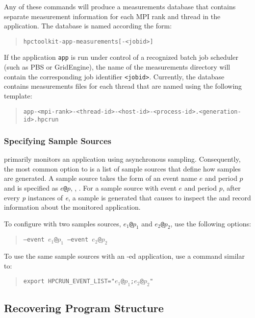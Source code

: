 \documentclass[11pt,letterpaper]{report}
\begin{document}
%
Any of these commands will produce a measurements database that contains separate measurement information for each MPI rank and thread in the application.
The database is named according the form:
\begin{quote}
  \verb|hpctoolkit-app-measurements[-<jobid>]|
\end{quote}
If the application \texttt{app} is run under control of a recognized batch job scheduler (such as PBS or GridEngine), the name of the measurements directory will contain the corresponding job identifier \texttt{<jobid>}.
Currently, the database contains measurements files for each thread that are named using the following template:
\begin{quote}
  \verb|app-<mpi-rank>-<thread-id>-<host-id>-<process-id>.<generation-id>.hpcrun|
\end{quote}

\subsubsection{Specifying Sample Sources}

\HPCToolkit{} primarily monitors an application using asynchronous sampling.
Consequently, the most common option to \hpcrun{} is a list of sample sources that define how samples are generated.
A sample source takes the form of an event name $e$ and period $p$ and is specified as \texttt{$e$@$p$}, \eg{}, .
For a sample source with event $e$ and period $p$, after every \emph{p} instances of \emph{e}, a sample is generated that causes \hpcrun{} to inspect the and record information about the monitored application.

To configure \hpcrun{} with two samples sources, \texttt{$e_1$@$p_1$} and \texttt{$e_2$@$p_2$}, use the following options:
\begin{quote}
  \texttt{--event $e_1$@$p_1$ --event $e_2$@$p_2$}
\end{quote}
To use the same sample sources with an \hpclink{}-ed application, use a command similar to:
\begin{quote}
  \texttt{export HPCRUN\_EVENT\_LIST="$e_1$@$p_1$;$e_2$@$p_2$"}
\end{quote}



\subsection{Recovering Program Structure}
\end{document}
